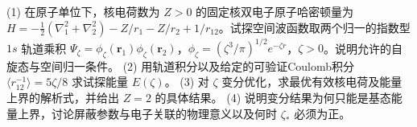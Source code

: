 (1) 在原子单位下，核电荷数为 \(Z>0\) 的固定核双电子原子哈密顿量为 \(H=-\tfrac12(\nabla_1^2+\nabla_2^2)-Z/r_1-Z/r_2+1/r_{12}\)。试探空间波函数取两个归一的指数型 \(1s\) 轨道乘积 \(\Psi_\zeta=\phi_\zeta(\mathbf r_1)\phi_\zeta(\mathbf r_2)\)，\(\phi_\zeta=(\zeta^3/\pi)^{1/2}e^{-\zeta r}\)，\(\zeta>0\)。说明允许的自旋态与空间归一条件。
(2) 用轨道积分以及给定的可验证Coulomb积分 \(\langle r_{12}^{-1}\rangle=5\zeta/8\) 求试探能量 \(E(\zeta)\)。
(3) 对 \(\zeta\) 变分优化，求最优有效核电荷及能量上界的解析式，并给出 \(Z=2\) 的具体结果。
(4) 说明变分结果为何只能是基态能量上界，讨论屏蔽参数与电子关联的物理意义以及何时 \(\zeta_*\) 必须为正。
